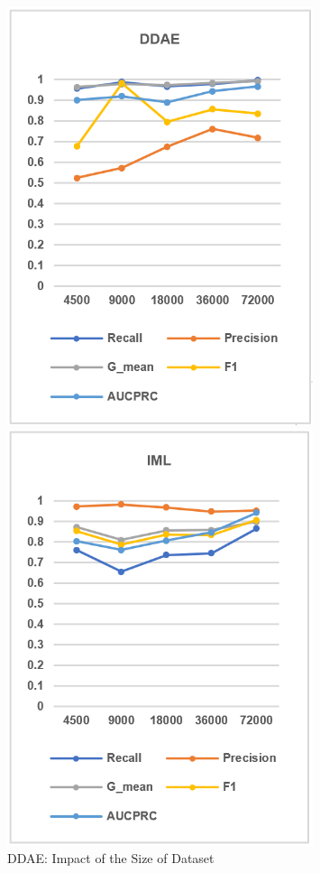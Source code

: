 \begin{figure}[H]
    \centering 
    \begin{minipage}{0.31\textwidth}
        \centering
        \includegraphics[width=0.8\textwidth]{images/fig18}
        \caption{DDAE: Impact of the Size of Dataset}
        \label{fig18}
    \end{minipage}
    \hspace{5pt}
    \begin{minipage}{0.31\textwidth}
        \centering
        \includegraphics[width=0.8\textwidth]{images/fig19}

\end{minipage}
\end{figure}
